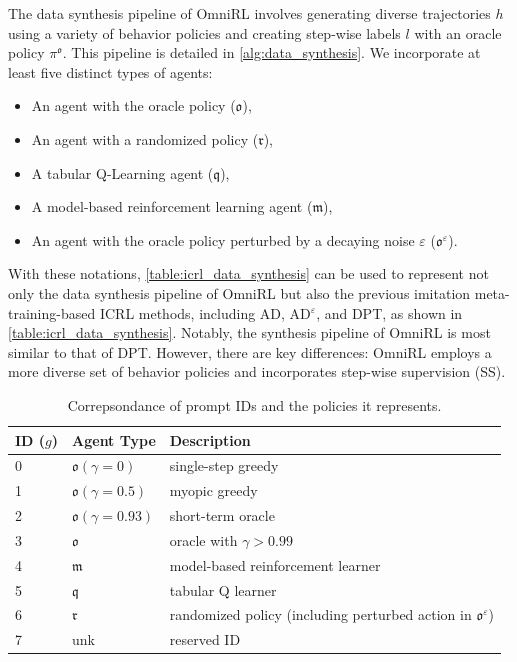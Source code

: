 \documentclass{article}
\begin{document}
The data synthesis pipeline of OmniRL involves generating diverse trajectories $h$ using a variety of behavior policies and creating step-wise labels $l$ with an oracle policy $ \pi^{\mathfrak{o}} $. This pipeline is detailed in \cref{alg:data_synthesis}. We incorporate at least five distinct types of agents:
\begin{itemize}
\item An agent with the oracle policy ($\mathfrak{o}$),
\item An agent with a randomized policy ($\mathfrak{r}$),
\item A tabular Q-Learning agent ($\mathfrak{q}$),
\item A model-based reinforcement learning agent ($\mathfrak{m}$),
\item An agent with the oracle policy perturbed by a decaying noise $\varepsilon$ ($\mathfrak{o}^\varepsilon$).
\end{itemize}
With these notations, \cref{table:icrl_data_synthesis} can be used to represent not only the data synthesis pipeline of OmniRL but also the previous imitation meta-training-based ICRL methods, including AD, AD$^\varepsilon$, and DPT, as shown in \cref{table:icrl_data_synthesis}. Notably, the synthesis pipeline of OmniRL is most similar to that of DPT. However, there are key differences: OmniRL employs a more diverse set of behavior policies and incorporates step-wise supervision (SS).
\begin{table}[t]
\caption{Correpsondance of prompt IDs and the policies it represents.}
\label{table:icrl_policy_type}
\vskip 0.15in
\begin{center}
\begin{small}
\begin{sc}
\begin{tabular}{lll}
\toprule
ID ($g$) & Agent Type & Description \\
\midrule
0   & $\mathfrak{o}(\gamma=0)$ & single-step greedy \\
1   & $\mathfrak{o}(\gamma=0.5)$ & myopic greedy \\
2   & $\mathfrak{o}(\gamma=0.93)$ & short-term oracle \\
3   & $\mathfrak{o}$ & oracle with $\gamma>0.99$ \\
4   & $\mathfrak{m}$ & model-based reinforcement learner \\
5   & $\mathfrak{q}$ & tabular Q learner \\
6   & $\mathfrak{r}$ & randomized policy (including perturbed action in $\mathfrak{o}^{\varepsilon}$) \\
7   & unk & reserved ID \\
\bottomrule
\end{tabular}
\end{sc}
\end{small}
\end{center}
\vskip -0.1in
\end{table}
\end{document}
